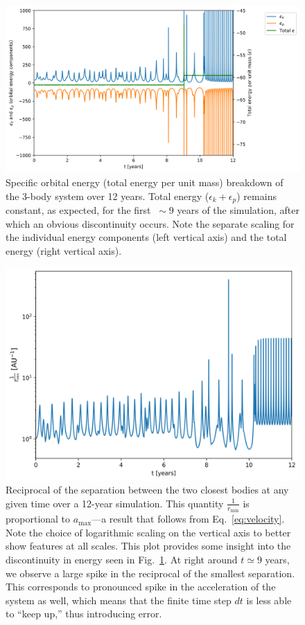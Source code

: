 \documentclass{article}
\begin{document}
\begin{figure}[H]
    \centering
    \includegraphics[width=5.5in]{homework4/q2_energy.png}
    \caption{Specific orbital energy (total energy per unit mass) breakdown of the 3-body system over 12 years. Total energy ($\epsilon_k + \epsilon_p$) remains constant, as expected, for the first $\ \sim 9$ years of the simulation, after which an obvious discontinuity occurs. Note the separate scaling for the individual energy components (left vertical axis) and the total energy (right vertical axis).}
    \label{fig:p2_energy}
\end{figure}

\begin{figure}[H]
    \centering
    \includegraphics[width=4.9in]{homework4/minsep.png}
    \caption{Reciprocal of the separation between the two closest bodies at any given time over a 12-year simulation. This quantity $\frac{1}{r_\text{min}}$ is proportional to $a_\text{max}$---a result that follows from Eq.~\ref{eq:velocity}. Note the choice of logarithmic scaling on the vertical axis to better show features at all scales. This plot provides some insight into the discontinuity in energy seen in Fig.~\ref{fig:p2_energy}. At right around $t\simeq9$ years, we observe a large spike in the reciprocal of the smallest separation. This corresponds to pronounced spike in the acceleration of the system as well, which means that the finite time step $dt$ is less able to ``keep up,'' thus introducing error.}
    \label{fig:minsep}
\end{figure}
\end{document}

